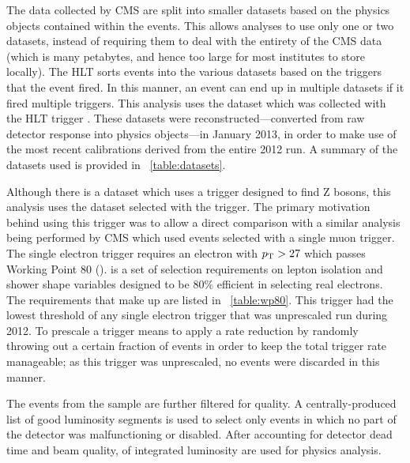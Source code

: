 The data collected by CMS are split into smaller datasets based on the physics
objects contained within the events. This allows analyses to use only one or
two datasets, instead of requiring them to deal with the entirety of the CMS
data (which is many petabytes, and hence too large for most institutes to store
locally). The HLT sorts events into the various datasets based on the triggers
that the event fired. In this manner, an event can end up in multiple datasets
if it fired multiple triggers. This analysis uses the \SingleElectron dataset
which was collected with the HLT trigger \SingleElectronTrigger. These datasets
were reconstructed---converted from raw detector response into physics
objects---in January 2013, in order to make use of the most recent
calibrations derived from the entire 2012 run. A summary of the datasets used
is provided in \TAB~\ref{table:datasets}.



Although there is a \DoubleElectron dataset which uses a trigger designed to
find Z bosons, this analysis uses the \SingleElectron dataset selected with the
\SingleElectronTrigger trigger. The primary motivation behind using this
trigger was to allow a direct comparison with a similar \phistar analysis being
performed by CMS which used \Ztomumu events selected with a single muon
trigger. The single electron trigger requires an electron with $p_{\mathrm{T}} > 27$ which
passes Working Point 80 (\WPEighty). \WPEighty is a set of selection
requirements on lepton isolation and shower shape variables designed to be 80\%
efficient in selecting real electrons. The requirements that make up \WPEighty
are listed in \TAB~\ref{table:wp80}. This trigger had the lowest \pt threshold
of any single electron trigger that was unprescaled run during 2012. To
prescale a trigger means to apply a rate reduction by randomly throwing out a
certain fraction of events in order to keep the total trigger rate manageable;
as this trigger was unprescaled, no events were discarded in this manner.



The events from the \SingleElectron sample are further filtered for quality. A
centrally-produced list of good luminosity segments is used to select only
events in which no part of the detector was malfunctioning or disabled. After
accounting for detector dead time and beam quality, \GoodLumiNumber of
integrated luminosity are used for physics analysis.


